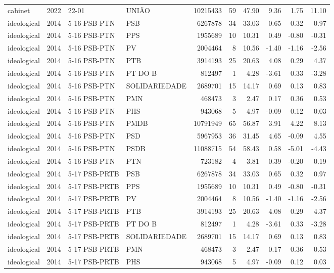 \begin{landscape}
\begin{longtable}{lllL{2.8cm}rrrrrr}
cabinet & 2022 & 22-01 & UNIÃO & 10215433 & 59 & 47.90 & 9.36 & 1.75 & 11.10 \\
ideological & 2014 & 5-16 PSB-PTN & PSB & 6267878 & 34 & 33.03 & 0.65 & 0.32 & 0.97 \\
ideological & 2014 & 5-16 PSB-PTN & PPS & 1955689 & 10 & 10.31 & 0.49 & -0.80 & -0.31 \\
ideological & 2014 & 5-16 PSB-PTN & PV & 2004464 & 8 & 10.56 & -1.40 & -1.16 & -2.56 \\
ideological & 2014 & 5-16 PSB-PTN & PTB & 3914193 & 25 & 20.63 & 4.08 & 0.29 & 4.37 \\
ideological & 2014 & 5-16 PSB-PTN & PT DO B & 812497 & 1 & 4.28 & -3.61 & 0.33 & -3.28 \\
ideological & 2014 & 5-16 PSB-PTN & SOLIDARIEDADE & 2689701 & 15 & 14.17 & 0.69 & 0.13 & 0.83 \\
ideological & 2014 & 5-16 PSB-PTN & PMN & 468473 & 3 & 2.47 & 0.17 & 0.36 & 0.53 \\
ideological & 2014 & 5-16 PSB-PTN & PHS & 943068 & 5 & 4.97 & -0.09 & 0.12 & 0.03 \\
ideological & 2014 & 5-16 PSB-PTN & PMDB & 10791949 & 65 & 56.87 & 3.91 & 4.22 & 8.13 \\
ideological & 2014 & 5-16 PSB-PTN & PSD & 5967953 & 36 & 31.45 & 4.65 & -0.09 & 4.55 \\
ideological & 2014 & 5-16 PSB-PTN & PSDB & 11088715 & 54 & 58.43 & 0.58 & -5.01 & -4.43 \\
ideological & 2014 & 5-16 PSB-PTN & PTN & 723182 & 4 & 3.81 & 0.39 & -0.20 & 0.19 \\
ideological & 2014 & 5-17 PSB-PRTB & PSB & 6267878 & 34 & 33.03 & 0.65 & 0.32 & 0.97 \\
ideological & 2014 & 5-17 PSB-PRTB & PPS & 1955689 & 10 & 10.31 & 0.49 & -0.80 & -0.31 \\
ideological & 2014 & 5-17 PSB-PRTB & PV & 2004464 & 8 & 10.56 & -1.40 & -1.16 & -2.56 \\
ideological & 2014 & 5-17 PSB-PRTB & PTB & 3914193 & 25 & 20.63 & 4.08 & 0.29 & 4.37 \\
ideological & 2014 & 5-17 PSB-PRTB & PT DO B & 812497 & 1 & 4.28 & -3.61 & 0.33 & -3.28 \\
ideological & 2014 & 5-17 PSB-PRTB & SOLIDARIEDADE & 2689701 & 15 & 14.17 & 0.69 & 0.13 & 0.83 \\
ideological & 2014 & 5-17 PSB-PRTB & PMN & 468473 & 3 & 2.47 & 0.17 & 0.36 & 0.53 \\
ideological & 2014 & 5-17 PSB-PRTB & PHS & 943068 & 5 & 4.97 & -0.09 & 0.12 & 0.03 \\

\end{longtable}
\end{landscape}
